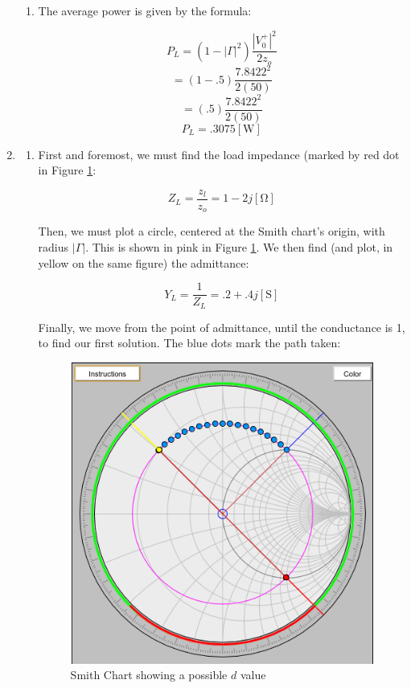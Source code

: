 \begin{enumerate}
\begin{enumerate}
      \item 

        The average power is given by the formula:

        $$P_L=(1-|\Gamma|^2)\frac{|V_0^+|^2}{2z_o}$$
        $$=(1-.5)\frac{7.8422^2}{2(50)}$$
        $$=(.5)\frac{7.8422^2}{2(50)}$$
        $$\boxed{P_L=.3075[\si{\watt}]}$$

    \end{enumerate}

  \item

    \begin{enumerate}
        
      \item 

        First and foremost, we must find the load impedance (marked by red dot in Figure \ref{fig:1}:

          $$Z_L=\frac{z_l}{z_o}=1-2j[\si{\ohm}]$$

          Then, we must plot a circle, centered at the Smith chart's origin, with radius $|\Gamma|$. This is shown in pink in Figure \ref{fig:1}. We then find (and plot, in yellow on the same figure) the admittance:

          $$Y_L=\frac{1}{Z_L}=.2+.4j[\text{S}]$$

          Finally, we move from the point of admittance, until the conductance is 1, to find our first solution. The blue dots mark the path taken:

          \begin{figure}[h!]
            \centering
            \includegraphics[width=.6\textwidth]{Figures/DValue.png}
            \caption{Smith Chart showing a possible $d$ value}
            \label{fig:1}
          \end{figure}


\end{enumerate}
\end{enumerate}
